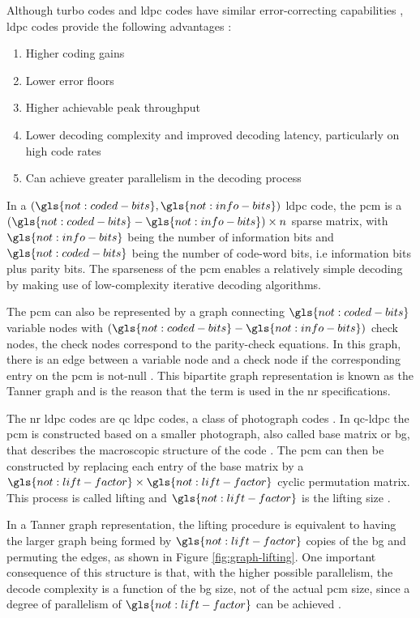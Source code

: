 Although turbo codes and \gls{ldpc} codes have similar error-correcting capabilities \cite{ErikDahlman5G}, \gls{ldpc} codes provide the following advantages \cite{Hui2018}:

\begin{enumerate}
    \item Higher coding gains
    \item Lower error floors
    \item Higher achievable peak throughput
    \item Lower decoding complexity and improved decoding latency, particularly on high code rates
    \item Can achieve greater parallelism in the decoding process
\end{enumerate}

In a $(\gls{not:coded-bits}, \gls{not:info-bits})$ \gls{ldpc} code, the \gls{pcm} is a $ (\gls{not:coded-bits}-\gls{not:info-bits}) \times n$ sparse matrix, with $\gls{not:info-bits}$ being the number of information bits and $\gls{not:coded-bits}$ being the number of code-word bits, i.e information bits plus parity bits.
%
The sparseness of the \gls{pcm} enables a relatively simple decoding by making use of low-complexity iterative decoding algorithms.


The \gls{pcm} can also be represented by a graph connecting $\gls{not:coded-bits}$ variable nodes with $(\gls{not:coded-bits}-\gls{not:info-bits})$ check nodes, the check nodes correspond to the parity-check equations.
%
In this graph, there is an edge between a variable node and a check node if the corresponding entry on the \gls{pcm} is not-null \cite{Richardson2018}.
%
This bipartite graph representation is known as the Tanner graph \cite{TannerGraph} and is the reason that the term  is used in the \gls{nr} specifications.
%


The \gls{nr} \gls{ldpc} codes are \gls{qc} \gls{ldpc} codes, a class of photograph codes \cite{bae_abotabl_lin_song_lee_2019}.
%
In \gls{qc}-\gls{ldpc} the \gls{pcm} is constructed based on a smaller photograph, also called base matrix or \gls{bg}, that describes the macroscopic structure of the code \cite{Richardson2018}.
%
The \gls{pcm} can then be constructed by replacing each entry of the base matrix by a $\gls{not:lift-factor} \times \gls{not:lift-factor} $ cyclic permutation matrix.
%
This process is called lifting and $\gls{not:lift-factor}$ is the lifting size \cite{AliZaidi632018}.


In a Tanner graph representation, the lifting procedure is equivalent to having the larger graph being formed by $\gls{not:lift-factor}$ copies of the \gls{bg} and permuting the edges, as shown in Figure \ref{fig:graph-lifting}.
%
One important consequence of this structure is that, with the higher possible parallelism, the decode complexity is a function of the \gls{bg} size, not of the actual \gls{pcm} size, since a degree of parallelism of $\gls{not:lift-factor}$ can be achieved \cite{bae_abotabl_lin_song_lee_2019}.

